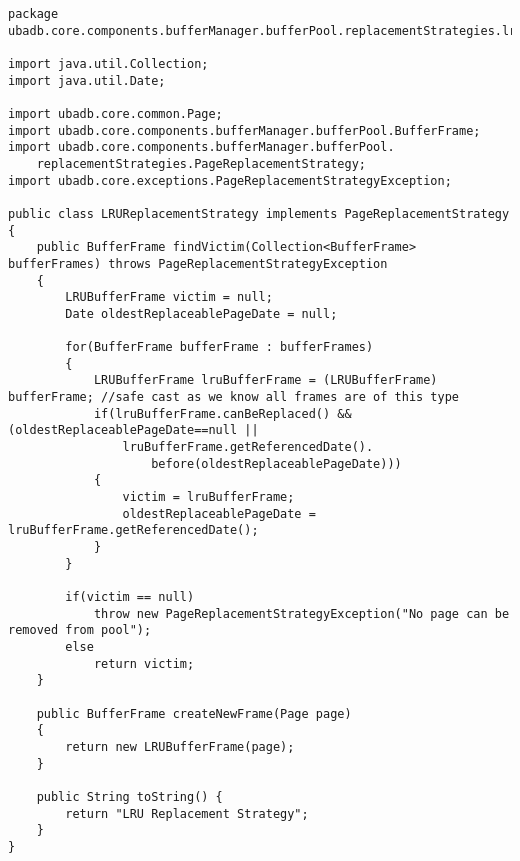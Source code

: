 \begin{lstlisting}
package ubadb.core.components.bufferManager.bufferPool.replacementStrategies.lru;

import java.util.Collection;
import java.util.Date;

import ubadb.core.common.Page;
import ubadb.core.components.bufferManager.bufferPool.BufferFrame;
import ubadb.core.components.bufferManager.bufferPool.
	replacementStrategies.PageReplacementStrategy;
import ubadb.core.exceptions.PageReplacementStrategyException;

public class LRUReplacementStrategy implements PageReplacementStrategy
{       
    public BufferFrame findVictim(Collection<BufferFrame> bufferFrames) throws PageReplacementStrategyException
    {               
    	LRUBufferFrame victim = null;
		Date oldestReplaceablePageDate = null;
		
		for(BufferFrame bufferFrame : bufferFrames)
		{
			LRUBufferFrame lruBufferFrame = (LRUBufferFrame) bufferFrame; //safe cast as we know all frames are of this type
			if(lruBufferFrame.canBeReplaced() && (oldestReplaceablePageDate==null || 
				lruBufferFrame.getReferencedDate().
					before(oldestReplaceablePageDate)))
			{
				victim = lruBufferFrame;
				oldestReplaceablePageDate = lruBufferFrame.getReferencedDate();
			}
		}
		
		if(victim == null)
			throw new PageReplacementStrategyException("No page can be removed from pool");
		else
			return victim;
    }
    
    public BufferFrame createNewFrame(Page page) 
    {
    	return new LRUBufferFrame(page);                     
    }
    
    public String toString() {
    	return "LRU Replacement Strategy";
    }
}
\end{lstlisting}

